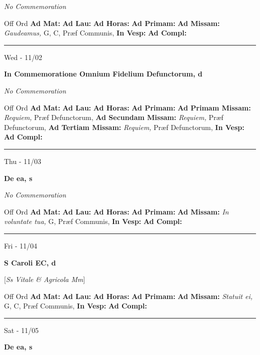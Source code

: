 \documentclass[letterpaper, 10pt]{article}
\begin{document}
\textit{No Commemoration}\begin{justify}
Off Ord
\textbf{Ad Mat: }
\textbf{Ad Lau: }
\textbf{Ad Horas: }
\textbf{Ad Primam: }
\textbf{Ad Missam:} \textit{Gaudeamus, } G, C, Præf Communis, 
\textbf{In Vesp: }
\textbf{Ad Compl: }\end{justify}



\hrule
\begin{center}
Wed - 11/02
\end{center}\textbf{ \large In Commemoratione Omnium Fidelium Defunctorum, \textnormal{\normalsize d}}

\textit{No Commemoration}\begin{justify}
Off Ord
\textbf{Ad Mat: }
\textbf{Ad Lau: }
\textbf{Ad Horas: }
\textbf{Ad Primam: }
\textbf{Ad Primam Missam:} \textit{Requiem, } Præf Defunctorum, \textbf{Ad Secundam Missam:} \textit{Requiem, } Præf Defunctorum, \textbf{Ad Tertiam Missam:} \textit{Requiem, } Præf Defunctorum, 
\textbf{In Vesp: }
\textbf{Ad Compl: }\end{justify}



\hrule
\begin{center}
Thu - 11/03
\end{center}\textbf{ \large De ea, \textnormal{\normalsize s}}

\textit{No Commemoration}\begin{justify}
Off Ord
\textbf{Ad Mat: }
\textbf{Ad Lau: }
\textbf{Ad Horas: }
\textbf{Ad Primam: }
\textbf{Ad Missam:} \textit{In voluntate tua, } G, Præf Communis, 
\textbf{In Vesp: }
\textbf{Ad Compl: }\end{justify}



\hrule
\begin{center}
Fri - 11/04
\end{center}\textbf{ \large S Caroli EC, \textnormal{\normalsize d}}

[\textit{Ss Vitale \& Agricola Mm}]
\begin{justify}
Off Ord
\textbf{Ad Mat: }
\textbf{Ad Lau: }
\textbf{Ad Horas: }
\textbf{Ad Primam: }
\textbf{Ad Missam:} \textit{Statuit ei, } G, C, Præf Communis, 
\textbf{In Vesp: }
\textbf{Ad Compl: }\end{justify}



\hrule
\begin{center}
Sat - 11/05
\end{center}\textbf{ \large De ea, \textnormal{\normalsize s}}
\end{document}
